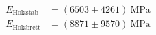 \begin{align*}E_\text{Holzstab} &= (6503 \pm 4261)~\text{MPa} \\E_\text{Holzbrett} &= (8871 \pm 9570)~\text{MPa}\end{align*}